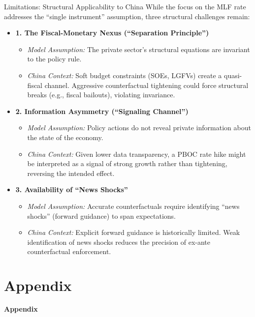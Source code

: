 \documentclass{beamer}
\begin{document}
\begin{frame}{Limitations: Structural Applicability to China}
    While the focus on the MLF rate addresses the ``single instrument'' assumption, three structural challenges remain:

    \begin{itemize}
        \item \textbf{1. The Fiscal-Monetary Nexus (``Separation Principle'')}
        \begin{itemize}
            \item \emph{Model Assumption:} The private sector's structural equations are invariant to the policy rule.
            \item \emph{China Context:} Soft budget constraints (SOEs, LGFVs) create a quasi-fiscal channel. Aggressive counterfactual tightening could force structural breaks (e.g., fiscal bailouts), violating invariance.
        \end{itemize}
        
        \item \textbf{2. Information Asymmetry (``Signaling Channel'')}
        \begin{itemize}
            \item \emph{Model Assumption:} Policy actions do not reveal private information about the state of the economy.
            \item \emph{China Context:} Given lower data transparency, a PBOC rate hike might be interpreted as a signal of strong growth rather than tightening, reversing the intended effect.
        \end{itemize}

        \item \textbf{3. Availability of ``News Shocks''}
        \begin{itemize}
            \item \emph{Model Assumption:} Accurate counterfactuals require identifying ``news shocks'' (forward guidance) to span expectations.
            \item \emph{China Context:} Explicit forward guidance is historically limited. Weak identification of news shocks reduces the precision of ex-ante counterfactual enforcement.
        \end{itemize}
    \end{itemize}
\end{frame}


\section{Appendix}
\begin{frame}[plain]
  \vfill %
  \centering %
  
  {\Huge \textbf{Appendix}} %
  
  \vfill %
\end{frame}
\end{document}
